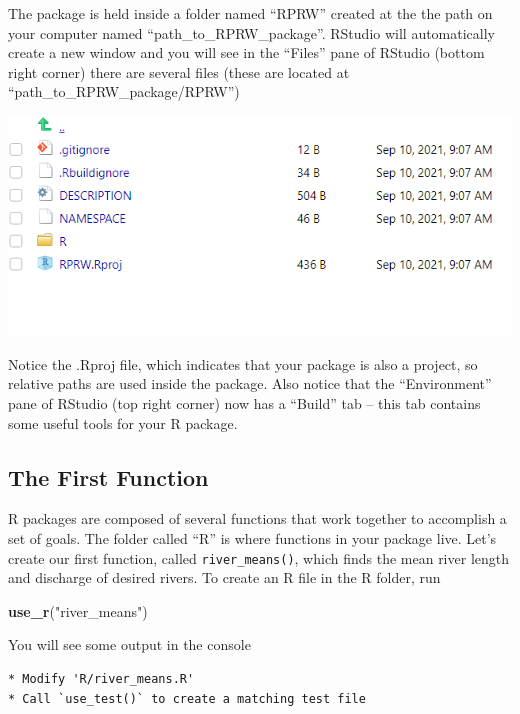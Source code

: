 \documentclass[
]{book}
\newenvironment{Shaded}{\begin{snugshade}}{\end{snugshade}}
\newcommand{\KeywordTok}[1]{\textcolor[rgb]{0.13,0.29,0.53}{\textbf{#1}}}
\newcommand{\NormalTok}[1]{#1}
\newcommand{\StringTok}[1]{\textcolor[rgb]{0.31,0.60,0.02}{#1}}
\begin{document}
The package is held inside a folder named ``RPRW'' created at the the path on your computer named ``path\_to\_RPRW\_package''. RStudio will automatically create a new window and you will see in the ``Files'' pane of RStudio (bottom right corner) there are several files (these are located at ``path\_to\_RPRW\_package/RPRW'')

\includegraphics[width=1\linewidth]{images/newrpack_files}

Notice the .Rproj file, which indicates that your package is also a project, so relative paths are used inside the package. Also notice that the ``Environment'' pane of RStudio (top right corner) now has a ``Build'' tab -- this tab contains some useful tools for your R package.

\hypertarget{first-function}{%
\subsection{The First Function}\label{first-function}}

R packages are composed of several functions that work together to accomplish a set of goals. The folder called ``R'' is where functions in your package live. Let's create our first function, called \texttt{river\_means()}, which finds the mean river length and discharge of desired rivers. To create an R file in the R folder, run

\begin{Shaded}
\begin{Highlighting}[]
\KeywordTok{use_r}\NormalTok{(}\StringTok{"river_means"}\NormalTok{)}
\end{Highlighting}
\end{Shaded}

You will see some output in the console

\begin{verbatim}
* Modify 'R/river_means.R'
* Call `use_test()` to create a matching test file 
\end{verbatim}
\end{document}
